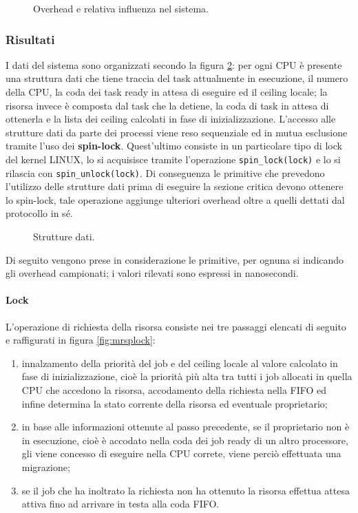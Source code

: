 {\begin{figure}
\centering
{}
\caption{Overhead e relativa influenza nel sistema.}
\label{fig:overheads_suffered}
\end{figure}

\subsubsection{Risultati}
\label{sec:overhead_ris}

\noindent I dati del sistema sono organizzati secondo la figura \ref{fig:datas}: per ogni CPU è presente una struttura dati che tiene traccia del task attualmente in esecuzione, il numero della CPU, la coda dei task ready in attesa di eseguire ed il ceiling locale; la risorsa invece è composta dal task che la detiene, la coda di task in attesa di ottenerla e la lista dei ceiling calcolati in fase di inizializzazione. L'accesso alle strutture dati da parte dei processi viene reso sequenziale ed in mutua esclusione tramite l'uso dei \textbf{spin-lock}. Quest'ultimo consiste in un particolare tipo di lock del kernel LINUX, lo si acquisisce tramite l'operazione \texttt{spin\_lock(lock)} e lo si rilascia con \texttt{spin\_unlock(lock)}. Di conseguenza le primitive che prevedono l'utilizzo delle strutture dati prima di eseguire la sezione critica devono ottenere lo spin-lock, tale operazione aggiunge ulteriori overhead oltre a quelli dettati dal protocollo in sé.\\

\begin{figure}
\centering
{}
\caption{Strutture dati.}
\label{fig:datas}
\end{figure}


\noindent Di seguito vengono prese in considerazione le primitive, per ognuna si indicando gli overhead campionati; i valori rilevati sono espressi in nanosecondi.

\paragraph{Lock}  L'operazione di richiesta della risorsa consiste nei tre passaggi elencati di seguito e raffigurati in figura \ref{fig:mrsplock}:

\begin{enumerate}
	\item innalzamento della priorità del job e del ceiling locale al valore calcolato in fase di inizializzazione, cioè la priorità più alta tra tutti i job allocati in quella CPU che accedono la risorsa, accodamento della richiesta nella FIFO ed infine determina la stato corrente della risorsa ed eventuale proprietario;
	\item in base alle informazioni ottenute al passo precedente, se il proprietario non è in esecuzione, cioè è accodato nella coda dei job ready di un altro processore, gli viene concesso di eseguire nella CPU correte, viene perciò effettuata una migrazione;
	\item se il job che ha inoltrato la richiesta non ha ottenuto la risorsa effettua attesa attiva fino ad arrivare in testa alla coda FIFO.
\end{enumerate}

}
